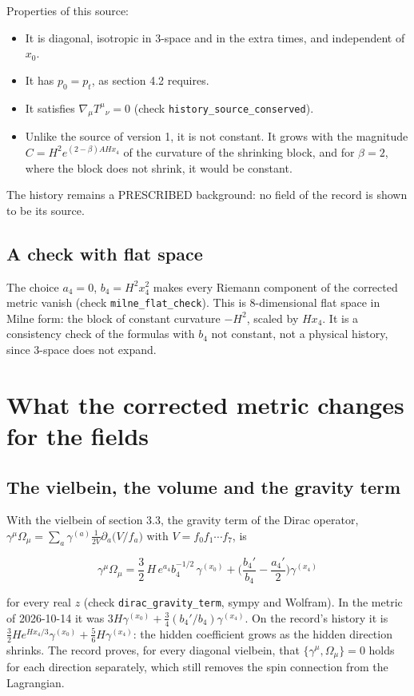 \documentclass[11pt]{article}
\begin{document}
Properties of this source:

\begin{itemize}
\item It is diagonal, isotropic in 3-space and in the extra times, and independent of $x_0$.
\item It has $p_0 = p_t$, as section 4.2 requires.
\item It satisfies $\nabla_\mu T^\mu{}_\nu = 0$ (check \texttt{history\_\allowbreak{}source\_c\allowbreak{}onserved}).
\item Unlike the source of version 1, it is not constant. It grows with the magnitude $C = H^2e^{(2-\beta)AHx_4}$ of the curvature of the shrinking block, and for $\beta = 2$, where the block does not shrink, it would be constant.
\end{itemize}

The history remains a PRESCRIBED background: no field of the record is shown to be its source.

\subsection{A check with flat space}

The choice $a_4 = 0$, $b_4 = H^2x_4^2$ makes every Riemann component of the corrected metric vanish (check \texttt{milne\_fl\allowbreak{}at\_check}). This is 8-dimensional flat space in Milne form: the block of constant curvature $-H^2$, scaled by $Hx_4$. It is a consistency check of the formulas with $b_4$ not constant, not a physical history, since 3-space does not expand.

\section{What the corrected metric changes for the fields}

\subsection{The vielbein, the volume and the gravity term}

With the vielbein of section 3.3, the gravity term of the Dirac operator, $\gamma^\mu\Omega_\mu = \sum_a\gamma^{(a)}\frac{1}{2V}\partial_a\big(V/f_a\big)$ with $V = f_0 f_1\cdots f_7$, is

\[
\gamma^\mu\Omega_\mu = \frac32\,H\,e^{a_4}b_4^{-1/2}\,\gamma^{(x_0)} + \Big(\frac{b_4'}{b_4} - \frac{a_4'}{2}\Big)\gamma^{(x_4)}
\]

for every real $z$ (check \texttt{dirac\_gr\allowbreak{}avity\_te\allowbreak{}rm}, sympy and Wolfram). In the metric of 2026-10-14 it was $3H\gamma^{(x_0)} + \frac34(b_4'/b_4)\gamma^{(x_4)}$. On the record's history it is $\frac32 He^{Hx_4/3}\gamma^{(x_0)} + \frac56 H\gamma^{(x_4)}$: the hidden coefficient grows as the hidden direction shrinks. The record proves, for every diagonal vielbein, that $\{\gamma^\mu, \Omega_\mu\} = 0$ holds for each direction separately, which still removes the spin connection from the Lagrangian.
\end{document}
